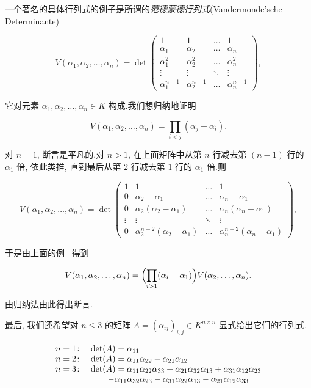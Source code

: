 \begin{bsp}\label{bsp:4.3.3}
一个著名的具体行列式的例子是所谓的\emph{范德蒙德行列式}(\textup{Vandermonde'sche Determinante})

\[
V(\alpha_1, \alpha_2, \ldots, \alpha_n) = \det \begin{pmatrix}
1 & 1 & \ldots & 1 \\
\alpha_1 & \alpha_2 & \ldots & \alpha_n \\
\alpha_1^2 & \alpha_2^2 & \ldots & \alpha_n^2 \\
\vdots & \vdots & \ddots & \vdots \\
\alpha_1^{n-1} & \alpha_2^{n-1} & \ldots & \alpha_n^{n-1}
\end{pmatrix},
\]

它对元素 $\alpha_1, \alpha_2, \ldots, \alpha_n \in K$ 构成.我们想归纳地证明

\[
V(\alpha_1, \alpha_2, \ldots, \alpha_n) = \prod_{i < j} (\alpha_j - \alpha_i).
\]

对 $n = 1$, 断言是平凡的.对 $n > 1$, 在上面矩阵中从第 $n$ 行减去第 $(n - 1)$ 行的 $\alpha_1$ 倍, 依此类推, 直到最后从第 $2$ 行减去第 $1$ 行的 $\alpha_1$ 倍.则

\[
V(\alpha_1, \alpha_2, \ldots, \alpha_n) = \det \begin{pmatrix}
1 & 1 & \ldots & 1 \\
0 & \alpha_2 - \alpha_1 & \ldots & \alpha_n - \alpha_1 \\
0 & \alpha_2(\alpha_2 - \alpha_1) & \ldots & \alpha_n(\alpha_n - \alpha_1) \\
\vdots & \vdots & \ddots & \vdots \\
0 & \alpha_2^{n-2}(\alpha_2 - \alpha_1) & \ldots & \alpha_n^{n-2}(\alpha_n - \alpha_1)
\end{pmatrix},
\]

于是由上面的例~ 得到

\[
V(\alpha_1, \alpha_2, \ldots, \alpha_n) = \Bigl(\prod_{i > 1} (\alpha_i - \alpha_1)\Bigr) V(\alpha_2, \ldots, \alpha_n).
\]

由归纳法由此得出断言.
\end{bsp}

最后, 我们还希望对 $n \leq 3$ 的矩阵 $A = (\alpha_{ij})_{i, j} \in K^{n \times n}$ 显式给出它们的行列式.

\[
\begin{array}{r l}
n = 1\colon & \det(A) = \alpha_{11} \\
n = 2\colon & \det(A) = \alpha_{11} \alpha_{22} - \alpha_{21} \alpha_{12} \\
n = 3\colon & \det(A) = \alpha_{11} \alpha_{22} \alpha_{33} + \alpha_{21} \alpha_{32} \alpha_{13} + \alpha_{31} \alpha_{12} \alpha_{23} \\
& \qquad - \alpha_{11} \alpha_{32} \alpha_{23} - \alpha_{31} \alpha_{22} \alpha_{13} - \alpha_{21} \alpha_{12} \alpha_{33}
\end{array}
\]

